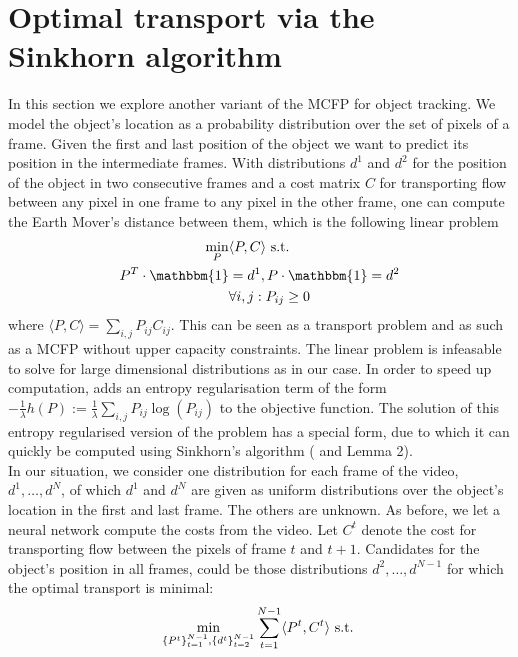 \documentclass{article}
\begin{document}
{\section{Optimal transport via the Sinkhorn algorithm}\label{Sinkhorn}
In this section we explore another variant of the MCFP for object tracking. We model the object's location as a probability distribution over the set of pixels of a frame. Given the first and last position of the object we want to predict its position in the intermediate frames. With distributions $d^1$ and $d^2$ for the position of the object in two consecutive frames and a cost matrix $C$ for transporting flow between any pixel in one frame to any pixel in the other frame, one can compute the Earth Mover's distance between them, which is the following linear problem
\begin{align}\label{EMD}
\min_{P} &\langle P, C \rangle \textnormal{ s.t. } \\
 P^T \cdot \mathbbm{1} &= d^1,  P\cdot \mathbbm{1} = d^2 \nonumber\\
&\forall i, j: P_{ij} \geq 0 \nonumber
\end{align}
where $\langle P, C \rangle = \sum_{i,j} P_{ij}C_{ij}$. This can be seen as a transport problem and as such as a MCFP without upper capacity constraints. The linear problem is infeasable to solve for large dimensional distributions as in our case. In order to speed up computation, \cite{Cut13} adds an entropy regularisation term of the form $-\frac{1}{\lambda}h(P) := \frac{1}{\lambda}\sum_{i,j} P_{ij}\log(P_{ij})$ to the objective function. The solution of this entropy regularised version of the problem has a special form, due to which it can quickly be computed using Sinkhorn's algorithm (\cite{Sink67} and \cite{Cut13} Lemma 2). \\
In our situation, we consider one distribution for each frame of the video, $d^1, \dots, d^N$, of which $d^1$ and $d^N$ are given as uniform distributions over the object's location in the first and last frame. The others are unknown. As before, we let a neural network compute the costs from the video. Let $C^t$ denote the cost for transporting flow between the pixels of frame $t$ and $t+1$. Candidates for the object's position in all frames, could be those distributions $d^2, \dots, d^{N-1}$ for which the optimal transport is minimal:
\begin{align}\label{EMDtrack}
&\min_{\{P^t\}_{t=1}^{N-1}, \{d^t\}_{t=2}^{N-1}} \sum_{t=1}^{N-1} \langle P^t, C^t\rangle \textnormal{ s.t. }\\

\end{align}}
\end{document}
